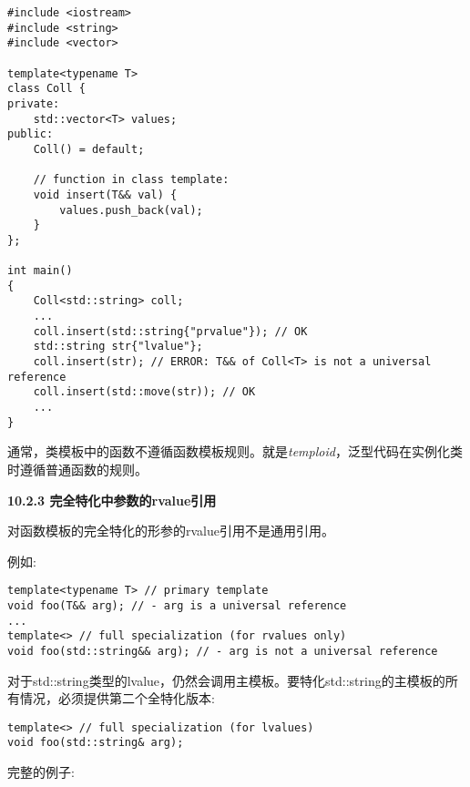 \begin{lstlisting}[caption={}]
#include <iostream>
#include <string>
#include <vector>

template<typename T>
class Coll {
private:
	std::vector<T> values;
public:
	Coll() = default;
	
	// function in class template:
	void insert(T&& val) {
		values.push_back(val);
	}
};

int main()
{
	Coll<std::string> coll;
	...
	coll.insert(std::string{"prvalue"}); // OK
	std::string str{"lvalue"};
	coll.insert(str); // ERROR: T&& of Coll<T> is not a universal reference
	coll.insert(std::move(str)); // OK
	...
}
\end{lstlisting}

通常，类模板中的函数不遵循函数模板规则。就是\textit{temploid}，泛型代码在实例化类时遵循普通函数的规则。\par

\hspace*{\fill} \par %
\textbf{10.2.3 完全特化中参数的rvalue引用}

对函数模板的完全特化的形参的rvalue引用不是通用引用。\par

例如:\par

\begin{lstlisting}[caption={}]
template<typename T> // primary template
void foo(T&& arg); // - arg is a universal reference
...
template<> // full specialization (for rvalues only)
void foo(std::string&& arg); // - arg is not a universal reference
\end{lstlisting}

对于std::string类型的lvalue，仍然会调用主模板。要特化std::string的主模板的所有情况，必须提供第二个全特化版本:\par

\begin{lstlisting}[caption={}]
template<> // full specialization (for lvalues)
void foo(std::string& arg);
\end{lstlisting}

完整的例子:\par

{\color{red}{generic/universalspec.cpp}}\par

